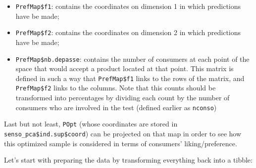 \documentclass[
]{krantz}
\makeatletter
\newenvironment{Shaded}{\begin{snugshade}}{\end{snugshade}}
\newcommand{\AttributeTok}[1]{\textcolor[rgb]{0.61,0.61,0.61}{#1}}
\newcommand{\DecValTok}[1]{\textcolor[rgb]{0.06,0.06,0.06}{#1}}
\newcommand{\FunctionTok}[1]{\textcolor[rgb]{0,0,0}{#1}}
\newcommand{\NormalTok}[1]{#1}
\newcommand{\OtherTok}[1]{\textcolor[rgb]{0.37,0.37,0.37}{#1}}
\newcommand{\SpecialCharTok}[1]{\textcolor[rgb]{0,0,0}{#1}}
\newcommand{\StringTok}[1]{\textcolor[rgb]{0.5,0.5,0.5}{#1}}
\providecommand{\tightlist}{%
  \setlength{\itemsep}{0pt}\setlength{\parskip}{0pt}}
\newenvironment{kframe}{%
\medskip{}
\setlength{\fboxsep}{.8em}
 \def\at@end@of@kframe{}%
 \ifinner\ifhmode%
  \def\at@end@of@kframe{\end{minipage}}%
  \begin{minipage}{\columnwidth}%
 \fi\fi%
 \def\FrameCommand##1{\hskip\@totalleftmargin \hskip-\fboxsep
 \colorbox{shadecolor}{##1}\hskip-\fboxsep
     \hskip-\linewidth \hskip-\@totalleftmargin \hskip\columnwidth}%
 \MakeFramed {\advance\hsize-\width
   \@totalleftmargin\z@ \linewidth\hsize
   \@setminipage}}%
 {\par\unskip\endMakeFramed%
 \at@end@of@kframe}
\renewenvironment{Shaded}{\begin{kframe}}{\end{kframe}}
\makeatother
\begin{document}
\begin{itemize}
\tightlist
\item
  \texttt{PrefMap\$f1}: contains the coordinates on dimension 1 in which predictions have be made;
\item
  \texttt{PrefMap\$f2}: contains the coordinates on dimension 2 in which predictions have be made;
\item
  \texttt{PrefMap\$nb.depasse}: contains the number of consumers at each point of the space that would accept a product located at that point. This matrix is defined in such a way that \texttt{PrefMap\$f1} links to the rows of the matrix, and \texttt{PrefMap\$f2} links to the columns. Note that this counts should be transformed into percentages by dividing each count by the number of consumers who are involved in the test (defined earlier as \texttt{nconso})
\end{itemize}

Last but not least, \texttt{POpt} (whose coordinates are stored in \texttt{senso\_pca\$ind.sup\$coord}) can be projected on that map in order to see how this optimized sample is considered in terms of consumers' liking/preference.

Let's start with preparing the data by transforming everything back into a tibble:

\begin{Shaded}
\end{Shaded}
\end{document}
